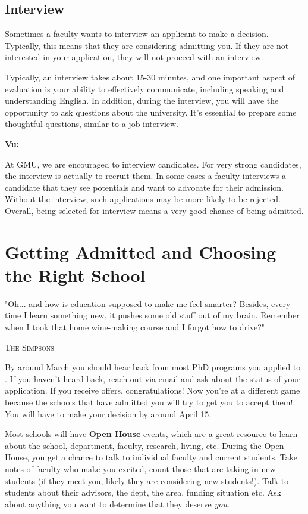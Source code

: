 \documentclass[11pt]{article}
\newenvironment{commentbox}[1][]{
\small
    \begin{cbox}
    \textbf{#1} 
 }{
   \end{cbox}
}
\begin{document}
\subsection{Interview}
Sometimes a faculty wants to interview an applicant to make a decision. Typically, this means that they are considering admitting you. If they are not interested in your application, they will not proceed with an interview. 

Typically, an interview takes about 15-30 minutes, and one important aspect of evaluation is your ability to effectively communicate, including speaking and understanding English. In addition, during the interview, you will have the opportunity to ask questions about the university. It's essential to prepare some thoughtful questions, similar to a job interview.


\begin{commentbox}[Vu:]
At GMU, we are encouraged to interview candidates. For very strong candidates, the interview is actually to recruit them.  In some cases a faculty interviews a candidate that they see potentials and want to advocate for their admission. Without the interview, such applications may be more likely to be rejected. Overall, being selected for interview means a very good chance of being admitted.
\end{commentbox}

\section{Getting Admitted and Choosing the Right School}

\epigraph{"Oh... and how is education supposed to make me feel smarter? Besides, every time I learn something new, it pushes some old stuff out of my brain. Remember when I took that home wine-making course and I forgot how to drive?"}{\textsc{The Simpsons}}

By around March you should hear back from most PhD programs you applied to . If you haven't heard back, reach out via email and ask about the status of your application.
If you receive offers, congratulations!  Now you're at a different game because the schools that have admitted you will try to get you to accept them!   You will have to make your decision by around April 15.

Most schools will have \textbf{Open House} events, which are a great resource to learn about the school, department, faculty, research, living, etc. During the Open House, you get a chance to talk to individual faculty and current students.  Take notes of faculty who make you excited, count those that are taking in new students (if they meet you, likely they are considering new students!).  Talk to students about their advisors, the dept, the area, funding situation etc.  Ask about anything you want to determine that they deserve \emph{you}.
\end{document}
